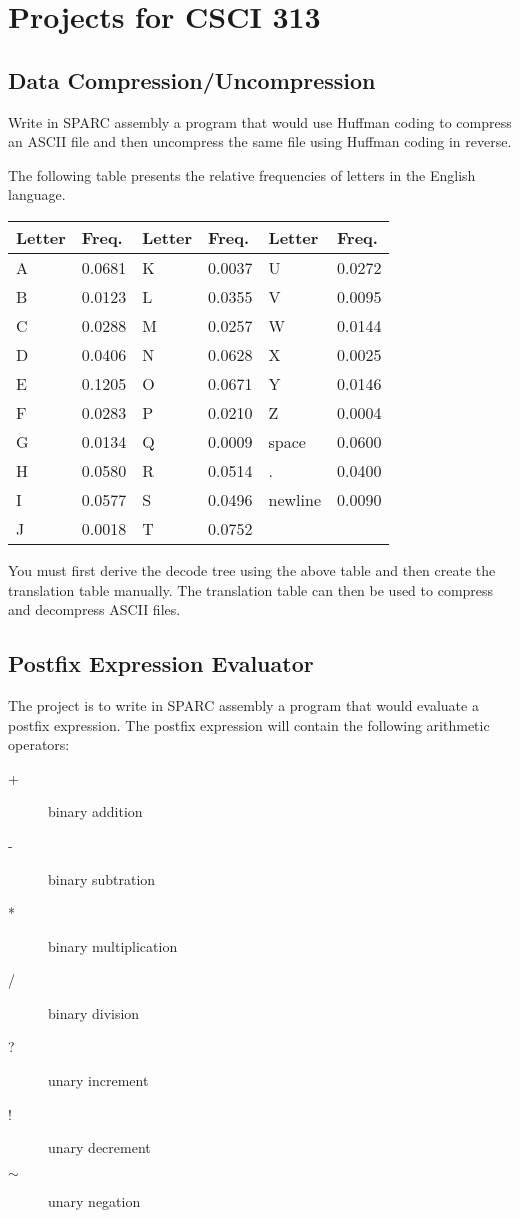 \chapter{Projects for CSCI 313}
\label{c-proj}

\section{Data Compression/Uncompression}

Write in SPARC assembly a program that would use Huffman coding to compress an ASCII file and then uncompress the same file using Huffman coding in reverse.

The following table presents the relative frequencies of letters in the English language.

\begin{tabular}{ll|ll|ll}
  Letter & Freq.  & Letter & Freq.  & Letter  & Freq. \\ \hline
  A      & 0.0681 & K      & 0.0037 & U       & 0.0272 \\
  B      & 0.0123 & L      & 0.0355 & V       & 0.0095 \\
  C      & 0.0288 & M      & 0.0257 & W       & 0.0144 \\
  D      & 0.0406 & N      & 0.0628 & X       & 0.0025 \\
  E      & 0.1205 & O      & 0.0671 & Y       & 0.0146 \\
  F      & 0.0283 & P      & 0.0210 & Z       & 0.0004 \\
  G      & 0.0134 & Q      & 0.0009 & space   & 0.0600 \\
  H      & 0.0580 & R      & 0.0514 & .       & 0.0400 \\
  I      & 0.0577 & S      & 0.0496 & newline & 0.0090 \\
  J      & 0.0018 & T      & 0.0752 &         &  \\
\end{tabular}

You must first derive the decode tree using the above table and then create the translation table manually.  The translation table can then be used to compress and decompress ASCII files.

\section{Postfix Expression Evaluator}

The project is to write in SPARC assembly a program that would evaluate a postfix expression.  The postfix expression will contain the following arithmetic operators:
\begin{description}
    \item[+] binary addition
    \item[-] binary subtration
    \item[*] binary multiplication
    \item[/] binary division
    \item[?] unary increment
    \item[!] unary decrement
    \item[$\sim$] unary negation
\end{description}

